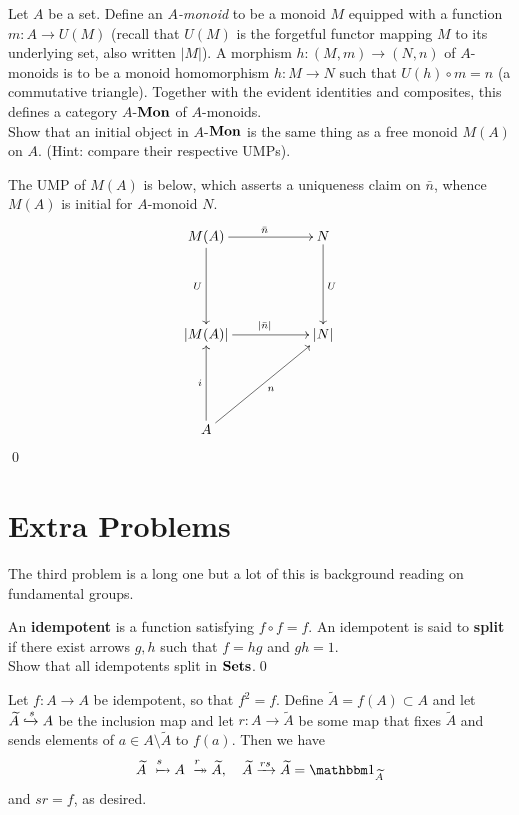 \begin{bookproblem}
  Let \(A\) be a set. Define an \textit{\(A\)-monoid} to be a monoid \(M\)
  equipped with a function \(m : A \to U(M)\) (recall that \(U(M)\) is the
  forgetful functor mapping \(M\) to its underlying set, also written \(|M|\)).
  A morphism \(h : (M,m) \to (N,n)\) of \(A\)-monoids is to be a monoid
  homomorphism \(h : M \to N\) such that \(U(h) \circ m = n\) (a commutative
  triangle).  Together with the evident identities and composites, this defines
  a category \(A\)-\(\mathbf{{Mon}}\) of \(A\)-monoids.\\

  Show that an initial object in \(A\)-\(\mathbf{{Mon}}\) is the same thing as a free
  monoid \(M(A)\) on \(A\). (Hint: compare their respective UMPs).
  \begin{Solution}
    The UMP of \(M(A)\) is below, which asserts a uniqueness claim on
    \(\bar{n}\), whence \(M(A)\) is initial for \(A\)-monoid \(N\).
    \[
      \xymatrix{
        M(A)  \ar[rr]^{\bar{n}}\ar[dd]_U && N  \ar[dd]^U\\
        &&\\
        |M(A)|\ar[rr]^{|\bar{n}|}     && |N|        \\
        &&\\
        A\ar[uu]^i\ar[uurr]_n  &&
      }
    \]
    \qed{}
  \end{Solution}
\end{bookproblem}

\section{Extra Problems}
The third problem is a long one but a lot of this is background reading on
fundamental groups.

\begin{problem}
  An \textbf{idempotent} is a function satisfying \(f\circ f = f\). An
  idempotent is said to \textbf{split} if there exist arrows \(g,h\) such that
  \(f = hg\) and \(gh = 1\).\\

  Show that all idempotents split in \(\mathbf{{Sets}}\).\qed{}
  \begin{Solution} Let \(f : A \to A\) be idempotent, so that \(f^2 = f\).
    Define \(\widetilde{A} = f(A) \subset A\) and let
    \(\widetilde{A}\xhookrightarrow{s} A\) be the inclusion map and let \(r: A \to
    \widetilde{A}\) be some map that fixes \(\widetilde{A}\) and sends elements
    of \(a \in A \setminus \widetilde{A}\) to \(f(a)\). Then we have
    \[\widetilde{A} \xmono{s} A \xepi{r} \widetilde{A},\quad \widetilde{A}
    \xto{rs} \widetilde{A} = \id_{\widetilde{A}}\] and \(sr = f\), as desired.
  \end{Solution}
\end{problem}

